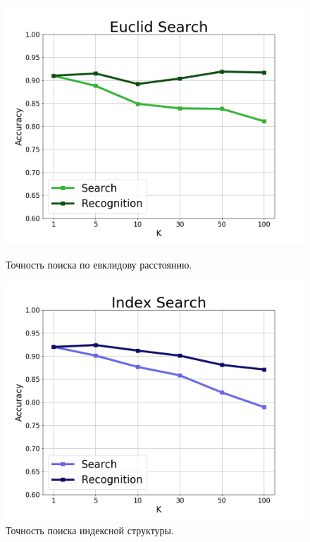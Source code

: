 \begin{figure}[h]
\begin{minipage}[h]{0.49\linewidth}
\includegraphics[width=1\linewidth]{Images/EuclidSearch.png}
\caption{Точность поиска по евклидову расстоянию.}
\label{ris:euclidsearch}
\end{minipage}
\hfill
\begin{minipage}[h]{0.49\linewidth}
\includegraphics[width=1\linewidth]{Images/IndexSearch.png}
\caption{Точность поиска индексной структуры.}
\label{ris:indexsearch}
\end{minipage}
\end{figure}

